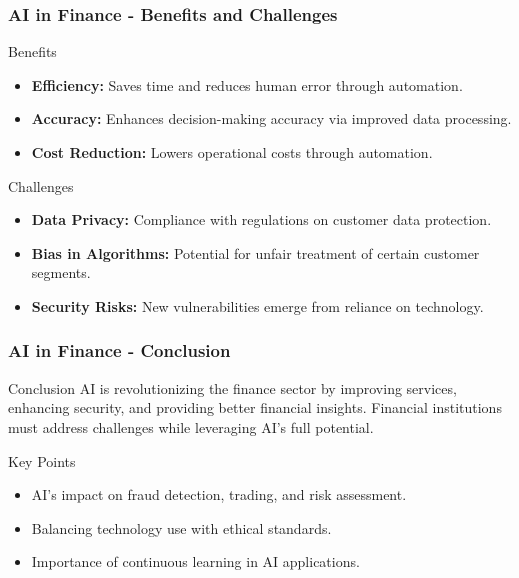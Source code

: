 \documentclass{beamer}
\begin{document}
\begin{frame}[fragile]
    \frametitle{AI in Finance - Benefits and Challenges}
    \begin{block}{Benefits}
        \begin{itemize}
            \item \textbf{Efficiency:} Saves time and reduces human error through automation.
            \item \textbf{Accuracy:} Enhances decision-making accuracy via improved data processing.
            \item \textbf{Cost Reduction:} Lowers operational costs through automation.
        \end{itemize}
    \end{block}
    
    \begin{block}{Challenges}
        \begin{itemize}
            \item \textbf{Data Privacy:} Compliance with regulations on customer data protection.
            \item \textbf{Bias in Algorithms:} Potential for unfair treatment of certain customer segments.
            \item \textbf{Security Risks:} New vulnerabilities emerge from reliance on technology.
        \end{itemize}
    \end{block}
\end{frame}

\begin{frame}[fragile]
    \frametitle{AI in Finance - Conclusion}
    \begin{block}{Conclusion}
        AI is revolutionizing the finance sector by improving services, enhancing security, and providing better financial insights. Financial institutions must address challenges while leveraging AI's full potential.
    \end{block}
    
    \begin{block}{Key Points}
        \begin{itemize}
            \item AI's impact on fraud detection, trading, and risk assessment.
            \item Balancing technology use with ethical standards.
            \item Importance of continuous learning in AI applications.
        \end{itemize}
    \end{block}
\end{frame}
\end{document}
